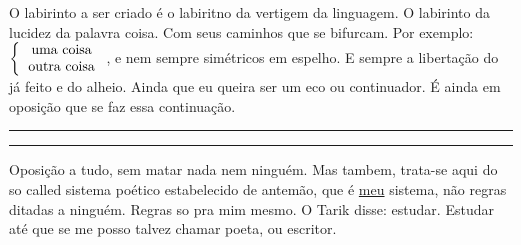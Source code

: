 \begingroup
\huge
\justify
O labirinto a ser criado é o labiritno da vertigem da linguagem. O labirinto da lucidez da palavra coisa. Com seus caminhos que se bifurcam. Por exemplo:$\left\{\begin{tabular}{c}uma coisa \\ outra coisa\end{tabular}\right .$, e nem sempre simétricos em espelho. E sempre a libertação do já feito e do alheio. Ainda que eu queira ser um eco ou continuador. É ainda em oposição que se faz essa continuação.
\begin{center}{\rule{4cm}{0.4pt}\raisebox{-0.5ex}{x}\rule{4cm}{0.4pt}}\end{center}
\begin{justify}
Oposição a tudo, sem matar nada nem ninguém. Mas tambem, trata-se aqui do so called sistema poético estabelecido de antemão, que é \underline{meu} sistema, não regras ditadas a ninguém. Regras so pra mim mesmo. O Tarik disse: estudar. Estudar até que se me posso talvez chamar poeta, ou escritor.
\end{justify}
\endgroup